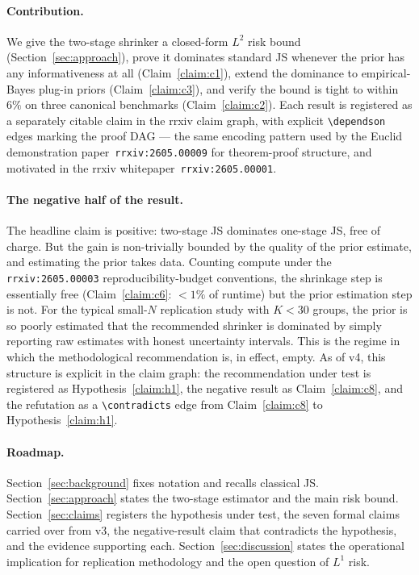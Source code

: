 \documentclass{rrxiv}
\begin{document}
\paragraph{Contribution.} We give the two-stage shrinker a closed-form $L^2$
risk bound (Section~\ref{sec:approach}), prove it dominates standard JS
whenever the prior has any informativeness at all (Claim~\ref{claim:c1}),
extend the dominance to empirical-Bayes plug-in priors (Claim~\ref{claim:c3}),
and verify the bound is tight to within $6\%$ on three canonical benchmarks
(Claim~\ref{claim:c2}). Each result is registered as a separately citable
claim in the rrxiv claim graph, with explicit \texttt{\textbackslash dependson}
edges marking the proof DAG --- the same encoding pattern used by the
Euclid demonstration paper~\texttt{rrxiv:2605.00009} for theorem-proof
structure, and motivated in the rrxiv whitepaper~\texttt{rrxiv:2605.00001}.

\paragraph{The negative half of the result.} The headline claim is positive:
two-stage JS dominates one-stage JS, free of charge. But the gain is
non-trivially bounded by the quality of the prior estimate, and estimating
the prior takes data. Counting compute under the
\texttt{rrxiv:2605.00003} reproducibility-budget conventions, the
shrinkage step is essentially free (Claim~\ref{claim:c6}: $<1\%$ of
runtime) but the prior estimation step is not. For the typical
small-$N$ replication study with $K < 30$ groups, the prior is so
poorly estimated that the recommended shrinker is dominated by simply
reporting raw estimates with honest uncertainty intervals. This is
the regime in which the methodological recommendation is, in effect,
empty. As of v4, this structure is explicit in the claim graph: the
recommendation under test is registered as
Hypothesis~\ref{claim:h1}, the negative result as
Claim~\ref{claim:c8}, and the refutation as a
\texttt{\textbackslash contradicts} edge from
Claim~\ref{claim:c8} to Hypothesis~\ref{claim:h1}.

\paragraph{Roadmap.} Section~\ref{sec:background} fixes notation and recalls
classical JS. Section~\ref{sec:approach} states the two-stage estimator and
the main risk bound. Section~\ref{sec:claims} registers the hypothesis
under test, the seven formal claims carried over from v3, the
negative-result claim that contradicts the hypothesis, and the evidence
supporting each. Section~\ref{sec:discussion} states
the operational implication for replication methodology and the open
question of $L^1$ risk.
\end{document}
